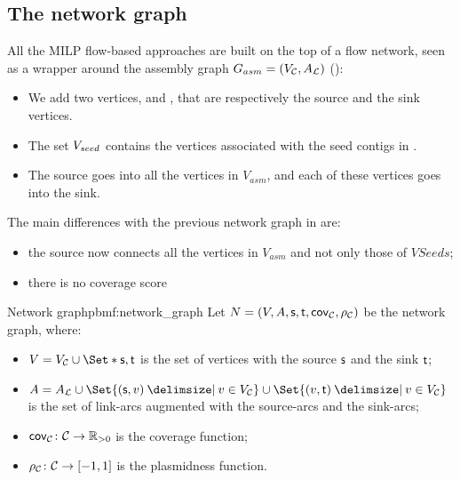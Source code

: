 \subsection{The network graph}\label{sec:pbmf:network}

All the MILP flow-based approaches are built on the top of a flow network, seen as a wrapper around the assembly graph \(G_{asm} = (V_{\mathcal{C}}{}, A_{\mathcal{L}})\) ():

\begin{itemize}
  \item We add two vertices, \source{} and \sink{}, that are respectively the source and the sink vertices.
  \item The set \(V_{seed}{}\) contains the vertices associated with the seed contigs in \ContigSeeds{}.
  \item The source goes into all the vertices in \(V_{asm}\), and each of these vertices goes into the sink.
\end{itemize}

The main differences with the previous network graph in  are:
\begin{itemize}
  \item the source now connects all the vertices in \(V_{asm}\) and not only those of \(VSeeds{}\);
  \item there is no coverage score
\end{itemize}

\begin{definition}{Network graph}{pbmf:network_graph}
  Let \(N = (V, A, \mathsf{s}{}, \mathsf{t}{}, \mathsf{cov}_{\mathcal{C}{}}, \rho_{\mathcal{C}{}})\) be the network graph, where:

  \begin{itemize}
    \item \( V = V_\Contigs{} \cup \Set*{\source{}, \sink{}} \) is the set of vertices with the source \(\mathsf{s}{}\) and the sink \(\mathsf{t}{}\);
    \item \( A = A_\Links{} \cup \Set{(\source, v) \given v \in V_\Contigs{}} \cup \Set{(v, \sink) \given v \in V_\Contigs{}} \) is the set of link-arcs augmented with the source-arcs and the sink-arcs;
    \item \( \mathsf{cov}_{\mathcal{C}{}} \colon \mathcal{C}{} \to \mathbb{R}{}_{> 0} \) is the coverage function;
    \item \( \rho_{\mathcal{C}{}} \colon \mathcal{C}{} \to [-1, 1] \) is the plasmidness function.
  \end{itemize}
\end{definition}
